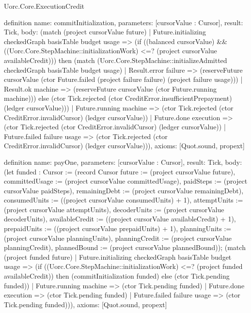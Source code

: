 \begin{lexlean}{Uorc.Core.ExecutionCredit}
\begin{semanticmodule}
definition{
  name: commitInitialization,
  parameters: [cursorValue : Cursor],
  result: Tick,
  body: (match (project cursorValue future)
    | Future.initializing checkedGraph basisTable budget usage => (if ((balanced cursorValue) && ((Uorc.Core.StepMachine::initializationWork) <=? (project cursorValue availableCredit))) then (match (Uorc.Core.StepMachine::initializeAdmitted checkedGraph basisTable budget usage)
      | Result.error failure => (reserveFuture cursorValue (ctor Future.failed (project failure failure) (project failure usage)))
      | Result.ok machine => (reserveFuture cursorValue (ctor Future.running machine))) else (ctor Tick.rejected (ctor CreditError.insufficientPrepayment) (ledger cursorValue)))
    | Future.running machine => (ctor Tick.rejected (ctor CreditError.invalidCursor) (ledger cursorValue))
    | Future.done execution => (ctor Tick.rejected (ctor CreditError.invalidCursor) (ledger cursorValue))
    | Future.failed failure usage => (ctor Tick.rejected (ctor CreditError.invalidCursor) (ledger cursorValue))),
  axioms: [Quot.sound, propext]
}

definition{
  name: payOne,
  parameters: [cursorValue : Cursor],
  result: Tick,
  body: (let funded : Cursor := (record Cursor {future := (project cursorValue future), committedUsage := (project cursorValue committedUsage), paidSteps := (project cursorValue paidSteps), remainingDebt := (project cursorValue remainingDebt), consumedUnits := ((project cursorValue consumedUnits) + 1), attemptUnits := (project cursorValue attemptUnits), decoderUnits := (project cursorValue decoderUnits), availableCredit := ((project cursorValue availableCredit) + 1), prepaidUnits := ((project cursorValue prepaidUnits) + 1), planningUnits := (project cursorValue planningUnits), planningCredit := (project cursorValue planningCredit), plannedBound := (project cursorValue plannedBound)}); (match (project funded future)
    | Future.initializing checkedGraph basisTable budget usage => (if ((Uorc.Core.StepMachine::initializationWork) <=? (project funded availableCredit)) then (commitInitialization funded) else (ctor Tick.pending funded))
    | Future.running machine => (ctor Tick.pending funded)
    | Future.done execution => (ctor Tick.pending funded)
    | Future.failed failure usage => (ctor Tick.pending funded))),
  axioms: [Quot.sound, propext]
}


\end{semanticmodule}
\end{lexlean}
